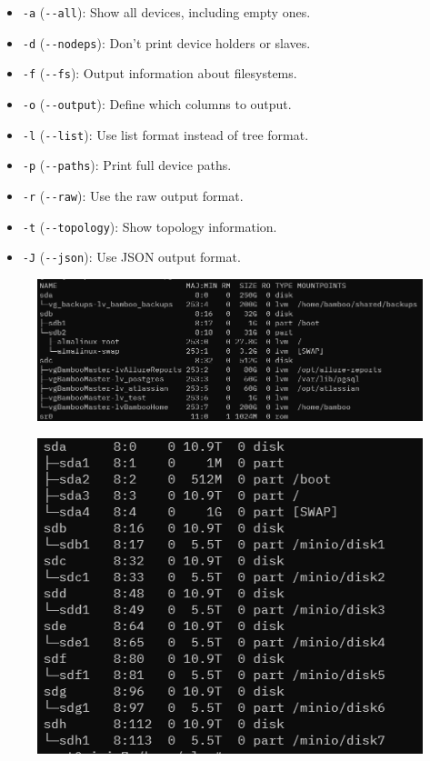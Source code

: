 \documentclass{article}
\begin{document}
\begin{itemize}
    \item \verb|-a| (\verb|--all|): Show all devices, including empty ones.
    \item \verb|-d| (\verb|--nodeps|): Don't print device holders or slaves.
    \item \verb|-f| (\verb|--fs|): Output information about filesystems.
    \item \verb|-o| (\verb|--output|): Define which columns to output.
    \item \verb|-l| (\verb|--list|): Use list format instead of tree format.
    \item \verb|-p| (\verb|--paths|): Print full device paths.
    \item \verb|-r| (\verb|--raw|): Use the raw output format.
    \item \verb|-t| (\verb|--topology|): Show topology information.
    \item \verb|-J| (\verb|--json|): Use JSON output format.
\end{itemize}

\begin{figure}[H]
    \includegraphics[width=\textwidth]{pictures/lsblk.png}
    \centering
\end{figure}

\begin{figure}[H]
    \includegraphics[scale=0.7]{pictures/lsblkm.png}
    \centering
\end{figure}
\end{document}
